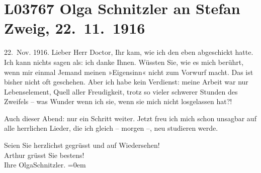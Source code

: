 

\section[Olga Schnitzler an Stefan Zweig, 22. 11. 1916]{L03767 Olga Schnitzler an Stefan Zweig, 22. 11. 1916}
\nopagebreak{}
\rehead{ }\normalsize\beginnumbering{}
\toendnotes[C]{\smallbreak\pagebreak[2]}
\toendnotes[C]{\smallbreak}
\pstart
           \raggedleft{}{\pb}22. Nov. 1916. \pend
           \vspace{0.5em}
\pstart
           Lieber Herr Doctor, Ihr \label{K_L03767-1v}\label{K_L03767-1} kam, wie ich den \label{K_L03767-2v}\label{K_L03767-2} eben
               abgeschickt hatte. Ich kann nichts sagen als: ich danke Ihnen. Wüssten Sie, wie es
               mich berührt, wenn mir einmal Jemand meinen »Eigensinn« nicht zum Vorwurf macht. Das
               ist bisher nicht oft geschehen. Aber ich habe {\pb}kein
               Verdienst: meine Arbeit war nur Lebenselement, Quell aller Freudigkeit, trotz so
               vieler schwerer Stunden des Zweifels – was Wunder wenn ich sie, wenn sie mich nicht
               losgelassen hat?!\pend
           
\pstart
           Auch dieser Abend: nur ein Schritt weiter. Jetzt freu ich mich schon unsagbar auf
               alle herrlichen Lieder, die ich gleich – morgen –, neu studieren werde.\pend
           
\pstart
           Seien Sie herzlichst gegrüsst und auf Wiedersehen!{\\[\baselineskip]}Arthur grüsst Sie bestens!{\\[\baselineskip]}Ihre
                  \spacefill\mbox{OlgaSchnitzler.}\pend
           \leftskip=0em{}\endnumbering{}
\begin{anhang}
\end{anhang}
      